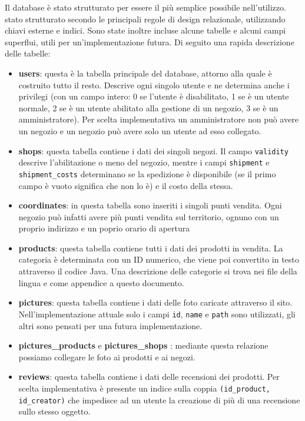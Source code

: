 Il database è stato strutturato per essere il più semplice possibile nell'utilizzo. \E stato strutturato secondo le principali regole di design relazionale, utilizzando chiavi esterne e indici. Sono state inoltre incluse alcune tabelle e alcuni campi superflui, utili per un'implementazione futura. Di seguito una rapida descrizione delle tabelle:
\begin{itemize}
  \item \textbf{users}: questa è la tabella principale del database, attorno alla quale è costruito tutto il resto. Descrive ogni singolo utente e ne determina anche i privilegi (con un campo intero: 0 se l'utente è disabilitato, 1 se è un utente normale, 2 se è un utente abilitato alla gestione di un negozio, 3 se è un amministratore). Per scelta implementativa un amministratore non può avere un negozio e un negozio può avere solo un utente ad esso collegato.
  \item \textbf{shops}: questa tabella contiene i dati dei singoli negozi. Il campo \texttt{validity} descrive l'abilitazione o meno del negozio, mentre i campi \texttt{shipment} e \texttt{shipment\_costs} determinano se la spedizione è disponibile (se il primo campo è vuoto significa che non lo è) e il costo della stessa.
  \item \textbf{coordinates}: in questa tabella sono inseriti i singoli punti vendita. Ogni negozio può infatti avere più punti vendita sul territorio, ognuno con un proprio indirizzo e un poprio orario di apertura
  \item \textbf{products}: questa tabella contiene tutti i dati dei prodotti in vendita. La categoria è determinata con un ID numerico, che viene poi convertito in testo attraverso il codice Java. Una descrizione delle categorie si trova nei file della lingua e come appendice a questo documento.
  \item \textbf{pictures}: questa tabella contiene i dati delle foto caricate attraverso il sito. Nell'implementazione attuale solo i campi \texttt{id}, \texttt{name} e \texttt{path} sono utilizzati, gli altri sono pensati per una futura implementazione.
  \item \textbf{pictures\_products} e \textbf{pictures\_shops} : mediante questa relazione possiamo collegare le foto ai prodotti e ai negozi.
  \item \textbf{reviews}: questa tabella contiene i dati delle recensioni dei prodotti. Per scelta  implementativa è presente un indice sulla coppia \texttt{(id\_product, id\_creator)} che impedisce ad un utente la creazione di più di una recensione sullo stesso oggetto.

\end{itemize}
